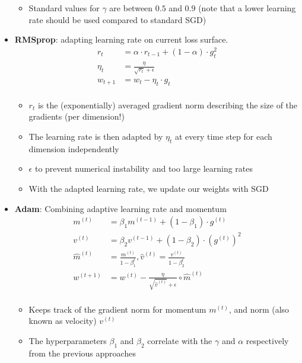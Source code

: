 \begin{itemize}
\begin{itemize}
		\item Standard values for $\gamma$ are between $0.5$ and $0.9$ (note that a lower learning rate should be used compared to standard SGD)
	\end{itemize}
	\item \textbf{RMSprop}: adapting learning rate on current loss surface.
	\begin{equation*}
		\begin{split}
			r_t & = \alpha \cdot r_{t-1} + \left(1 - \alpha\right) \cdot g_t^2\\
			\eta_t & = \frac{\eta}{\sqrt{r_t} + \epsilon} \\
			w_{t+1} & = w_{t} - \eta_t \cdot g_t\\
		\end{split}
	\end{equation*}
	\begin{itemize}
		\item $r_t$ is the (exponentially) averaged gradient norm describing the size of the gradients (per dimension!)
		\item The learning rate is then adapted by $\eta_t$ at every time step for each dimension independently
		\item $\epsilon$ to prevent numerical instability and too large learning rates
		\item With the adapted learning rate, we update our weights with SGD
	\end{itemize}
	\item \textbf{Adam}: Combining adaptive learning rate and momentum
	\begin{equation*}
		\begin{split}
			m^{(t)} & = \beta_1 m^{(t-1)} + (1 - \beta_1)\cdot g^{(t)}\\
			v^{(t)} & = \beta_2 v^{(t-1)} + (1 - \beta_2)\cdot \left(g^{(t)}\right)^2\\
			\hat{m}^{(t)} & = \frac{m^{(t)}}{1-\beta^{t}_1}, \hat{v}^{(t)} = \frac{v^{(t)}}{1-\beta^{t}_2}\\
			w^{(t+1)} & = w^{(t)} - \frac{\eta}{\sqrt{\hat{v}^{(t)}} + \epsilon}\circ \hat{m}^{(t)}\\
		\end{split}
	\end{equation*}
	\begin{itemize}
		\item Keeps track of the gradient norm for momentum $m^{(t)}$, and norm (also known as velocity) $v^{(t)}$
		\item The hyperparameters $\beta_1$ and $\beta_2$ correlate with the $\gamma$ and $\alpha$ respectively from the previous approaches

\end{itemize}
\end{itemize}
